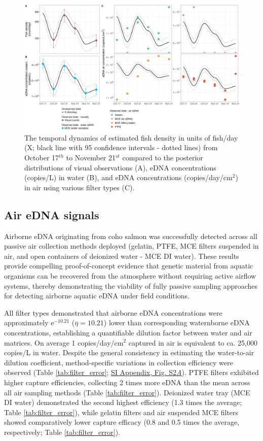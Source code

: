 \documentclass{article}
\begin{document}
\begin{figure}[tbhp] 
\centering
\includegraphics[width=16.5cm]{Plots/Figure_1.jpg}  
\caption{The temporal dynamics of estimated fish density in units of fish/day (X; black line with 95 confidence intervals - dotted lines) from October 17$^{th}$ to November 21$^{st}$ compared to the posterior distributions of visual observations (A), eDNA concentrations (copies/L) in water (B), and eDNA concentrations (copies/day/cm$^2$) in air using various filter types (C).}
\label{fig:fig1}
\end{figure}


\subsection{Air eDNA signals}
Airborne eDNA originating from coho salmon was successfully detected across all passive air collection methods deployed (gelatin, PTFE, MCE filters suspended in air, and open containers of deionized water - MCE DI water). These results provide compelling proof-of-concept evidence that genetic material from aquatic organisms can be recovered from the atmosphere without requiring active airflow systems, thereby demonstrating the viability of fully passive sampling approaches for detecting airborne aquatic eDNA under field conditions.

All filter types demonstrated that airborne eDNA concentrations were approximately e$^{-10.21}$ ($\overline\eta = 10.21$) lower than corresponding waternborne eDNA concentrations, establishing a quantifiable dilution factor between water and air matrices. On average 1 copies/day/cm$^2$ captured in air is equivalent to ca. 25,000 copies/L in water. Despite the general consistency in estimating the water-to-air dilution coefficient, method-specific variations in collection efficiency were observed (Table \ref{tab:filter_error}; \href{SI_Appendix.pdf}{SI Appendix, Fig. S2\textit{A}}). PTFE filters exhibited higher capture efficiencies, collecting 2 times more eDNA than the mean across all air sampling methods (Table \ref{tab:filter_error}). Deionized water tray (MCE DI water) demonstrated the second highest efficiency (1.3 times the average; Table \ref{tab:filter_error}), while gelatin filters and air suspended MCE filters showed comparatively lower capture efficacy (0.8 and 0.5 times the average, respectively; Table \ref{tab:filter_error}).
\end{document}
